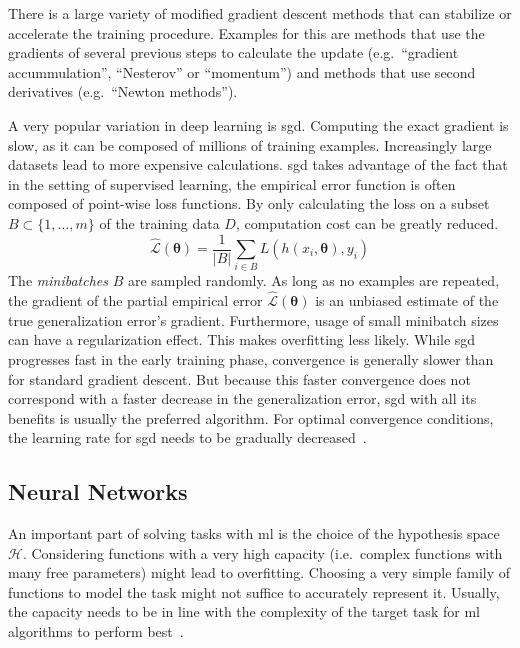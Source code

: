 There is a large variety of modified gradient descent methods that can stabilize or accelerate the training procedure.
Examples for this are methods that use the gradients of several previous steps to calculate the update (e.g.\ \enquote{gradient accummulation}, \enquote{Nesterov} or \enquote{momentum}) and methods that use second derivatives (e.g.\ \enquote{Newton methods}).

A very popular variation in deep learning is \gls{sgd}.
Computing the exact gradient is slow, as it can be composed of millions of training examples.
Increasingly large datasets lead to more expensive calculations.
\gls{sgd} takes advantage of the fact that in the setting of supervised learning, the empirical error function is often composed of point-wise loss functions.
By only calculating the loss on a subset $B \subset \{1,\dots,m\}$ of the training data $D$, computation cost can be greatly reduced.
\[
    \hat{\mathcal{L}}(\boldsymbol{\theta}) = \frac{1}{|B|}\sum_{i \in B} L(h(x_i, \boldsymbol{\theta}), y_i)
\]
The \textit{minibatches} $B$ are sampled randomly.
As long as no examples are repeated, the gradient of the partial empirical error $\hat{\mathcal{L}}(\boldsymbol{\theta})$ is an unbiased estimate of the true generalization error's gradient.
Furthermore, usage of small minibatch sizes can have a regularization effect.
This makes overfitting less likely.
While \gls{sgd} progresses fast in the early training phase, convergence is generally slower than for standard gradient descent.
But because this faster convergence does not correspond with a faster decrease in the generalization error, \gls{sgd} with all its benefits is usually the preferred algorithm.
For optimal convergence conditions, the learning rate for \gls{sgd} needs to be gradually decreased~\autocite{Goodfellow-et-al-2016}.

\subsection{Neural Networks}\label{subsec:dnn}
An important part of solving tasks with \gls{ml} is the choice of the hypothesis space $\mathcal{H}$.
Considering functions with a very high capacity (i.e.\ complex functions with many free parameters) might lead to overfitting.
Choosing a very simple family of functions to model the task might not suffice to accurately represent it.
Usually, the capacity needs to be in line with the complexity of the target task for \gls{ml} algorithms to perform best~\autocite{Goodfellow-et-al-2016}.

